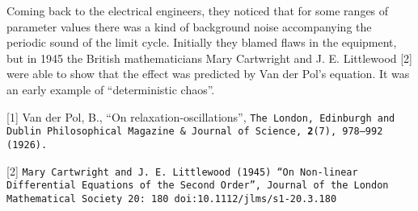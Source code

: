   Coming back to the electrical engineers, they noticed that for some ranges of 
  parameter values there was a kind of background noise accompanying the 
  periodic sound of the limit cycle. Initially they blamed flaws in the 
  equipment, but in 1945 the British mathematicians Mary Cartwright and J. E. 
  Littlewood [2] were able to show that the effect was predicted by Van der 
  Pol's equation. It was an early example of ``deterministic chaos''. 

  \sectionreferences{}[1] Van der Pol, B., ``On relaxation-oscillations'', \tt{}The London, 
  Edinburgh and Dublin Philosophical Magazine \& Journal of Science\rm{}, 
  \textbf{2}(7), 978–992 (1926). 

  [2] \tt{}Mary 
  Cartwright\rm{} and \tt{}J. E. Littlewood\rm{} 
  (1945) ``On Non-linear Differential Equations of the Second Order'', \tt{}Journal 
  of the London Mathematical Society\rm{} 20: 180 \tt{}doi\rm{}:\tt{}10.1112/jlms/s1-20.3.180\rm{} 